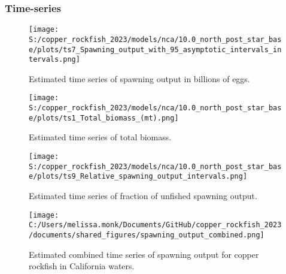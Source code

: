 \documentclass[11pt,
  letterpaper,
]{article}
\begin{document}
\subsubsection{Time-series}\label{time-series}

\begin{figure}
{\centering
\texttt{[image: S:/copper\_rockfish\_2023/models/nca/10.0\_north\_post\_star\_base/plots/ts7\_Spawning\_output\_with\_95\_asymptotic\_intervals\_intervals.png]}
}
\caption{Estimated time series of spawning output in billions of eggs.\label{fig:ssb}}
\end{figure}

\pagebreak

\begin{figure}
{\centering
\texttt{[image: S:/copper\_rockfish\_2023/models/nca/10.0\_north\_post\_star\_base/plots/ts1\_Total\_biomass\_(mt).png]}
}
\caption{Estimated time series of total biomass.\label{fig:tot-bio}}
\end{figure}

\pagebreak

\begin{figure}
{\centering
\texttt{[image: S:/copper\_rockfish\_2023/models/nca/10.0\_north\_post\_star\_base/plots/ts9\_Relative\_spawning\_output\_intervals.png]}
}
\caption{Estimated time series of fraction of unfished spawning output.\label{fig:depl}}
\end{figure}

\pagebreak

\begin{figure}
{\centering
\texttt{[image: C:/Users/melissa.monk/Documents/GitHub/copper\_rockfish\_2023/documents/shared\_figures/spawning\_output\_combined.png]}
}
\caption{Estimated combined time series of spawning output for copper rockfish in California waters.\label{fig:sb-all}}
\end{figure}
\end{document}
